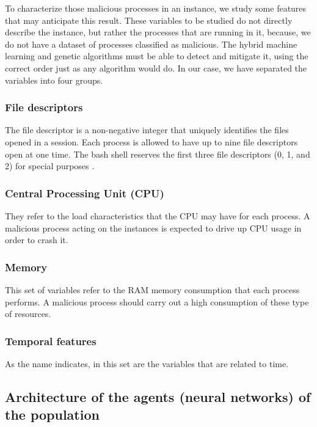 \documentclass{iosart2c}
\begin{document}
To characterize those malicious processes in an instance, we study some features that may anticipate this result. These variables to be studied do not directly describe the instance, but rather the processes that are running in it, because, we do not have a dataset of processes classified as malicious. The hybrid machine learning and genetic algorithms must be able to detect and mitigate it, using the correct order just as any algorithm would do. In our case, we have separated the variables into four groups.\\


\subsubsection{File descriptors}

The file descriptor is a non-negative integer that uniquely identifies the files opened in a session. Each process is allowed to have up to nine file descriptors open at one time. The bash shell reserves the first three file descriptors (0, 1, and 2) for special purposes \cite{shell_scripting2}. 

\subsubsection{Central Processing Unit (CPU)}

They refer to the load characteristics that the CPU may have for each process. A malicious process acting on the instances is expected to drive up CPU usage in order to crash it.\\

\subsubsection{Memory}

This set of variables refer to the RAM memory consumption that each process performs. A malicious process should carry out a high consumption of these type of resources. 


\subsubsection{Temporal features}

As the name indicates, in this set are the variables that are related to time.\\

\subsection{Architecture of the agents (neural networks) of the population} \label{arquitectura_agents}
\end{document}
